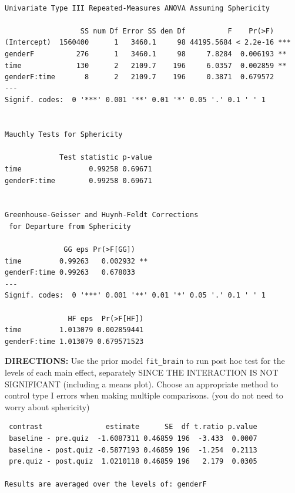 \documentclass[]{article}
\newenvironment{Shaded}{\begin{snugshade}}{\end{snugshade}}
\newcommand{\KeywordTok}[1]{\textcolor[rgb]{0.13,0.29,0.53}{\textbf{#1}}}
\newcommand{\DataTypeTok}[1]{\textcolor[rgb]{0.13,0.29,0.53}{#1}}
\newcommand{\StringTok}[1]{\textcolor[rgb]{0.31,0.60,0.02}{#1}}
\newcommand{\CommentTok}[1]{\textcolor[rgb]{0.56,0.35,0.01}{\textit{#1}}}
\newcommand{\OperatorTok}[1]{\textcolor[rgb]{0.81,0.36,0.00}{\textbf{#1}}}
\newcommand{\NormalTok}[1]{#1}
\begin{document}
\begin{verbatim}

Univariate Type III Repeated-Measures ANOVA Assuming Sphericity

                  SS num Df Error SS den Df          F    Pr(>F)    
(Intercept)  1560400      1   3460.1     98 44195.5684 < 2.2e-16 ***
genderF          276      1   3460.1     98     7.8284  0.006193 ** 
time             130      2   2109.7    196     6.0357  0.002859 ** 
genderF:time       8      2   2109.7    196     0.3871  0.679572    
---
Signif. codes:  0 '***' 0.001 '**' 0.01 '*' 0.05 '.' 0.1 ' ' 1


Mauchly Tests for Sphericity

             Test statistic p-value
time                0.99258 0.69671
genderF:time        0.99258 0.69671


Greenhouse-Geisser and Huynh-Feldt Corrections
 for Departure from Sphericity

              GG eps Pr(>F[GG])   
time         0.99263   0.002932 **
genderF:time 0.99263   0.678033   
---
Signif. codes:  0 '***' 0.001 '**' 0.01 '*' 0.05 '.' 0.1 ' ' 1

               HF eps  Pr(>F[HF])
time         1.013079 0.002859441
genderF:time 1.013079 0.679571523
\end{verbatim}

\clearpage

\textbf{DIRECTIONS:} Use the prior model \texttt{fit\_brain} to run post
hoc test for the levels of each main effect, separately SINCE THE
INTERACTION IS NOT SIGNIFICANT (including a means plot). Choose an
appropriate method to control type I errors when making multiple
comparisons. (you do not need to worry about sphericity)

\begin{Shaded}
\end{Shaded}

\begin{verbatim}
 contrast               estimate      SE  df t.ratio p.value
 baseline - pre.quiz  -1.6087311 0.46859 196  -3.433  0.0007
 baseline - post.quiz -0.5877193 0.46859 196  -1.254  0.2113
 pre.quiz - post.quiz  1.0210118 0.46859 196   2.179  0.0305

Results are averaged over the levels of: genderF 
\end{verbatim}
\end{document}
